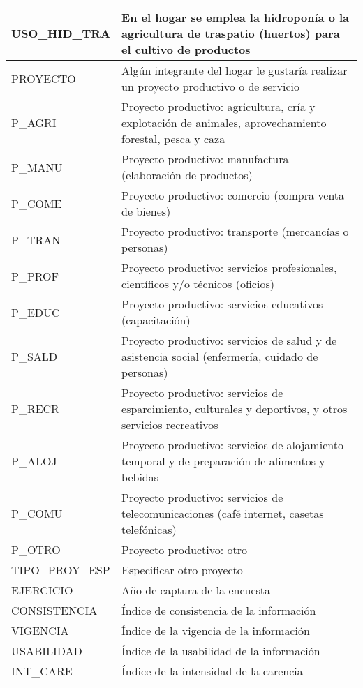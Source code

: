 \begin{longtable}{|p{8cm}|p{8cm}|}
    \hline
    USO\_HID\_TRA & En el hogar se emplea la hidroponía o la agricultura de traspatio (huertos) para el cultivo de productos \\
    \hline
    PROYECTO & Algún integrante del hogar le gustaría realizar un proyecto productivo o de servicio \\
    \hline
    P\_AGRI & Proyecto productivo: agricultura, cría y explotación de animales, aprovechamiento forestal, pesca y caza \\
    \hline
    P\_MANU & Proyecto productivo: manufactura (elaboración de productos) \\
    \hline
    P\_COME & Proyecto productivo: comercio (compra-venta de bienes)\\
    \hline
    P\_TRAN & Proyecto productivo: transporte (mercancías o personas)\\
    \hline
    P\_PROF & Proyecto productivo: servicios profesionales, científicos y/o técnicos (oficios)\\
    \hline
    P\_EDUC & Proyecto productivo: servicios educativos (capacitación) \\
    \hline
    P\_SALD & Proyecto productivo: servicios de salud y de asistencia social (enfermería, cuidado de personas)\\
    \hline
    P\_RECR & Proyecto productivo: servicios de esparcimiento, culturales y deportivos, y otros servicios recreativos\\
    \hline
    P\_ALOJ & Proyecto productivo: servicios de alojamiento temporal y de preparación de alimentos y bebidas\\
    \hline
    P\_COMU & Proyecto productivo: servicios de telecomunicaciones (café internet, casetas telefónicas)\\
    \hline
    P\_OTRO & Proyecto productivo: otro\\
    \hline
    TIPO\_PROY\_ESP &  Especificar otro proyecto \\
    \hline
    EJERCICIO & Año de captura de la encuesta \\
    \hline
    CONSISTENCIA & Índice de consistencia de la información \\
    \hline
    VIGENCIA & Índice de la vigencia de la información \\
    \hline
    USABILIDAD & Índice de la usabilidad de la información \\
    \hline
    INT\_CARE & Índice de la intensidad de la carencia \\
    \hline
\end{longtable}
\label{tab:varsocioe}

